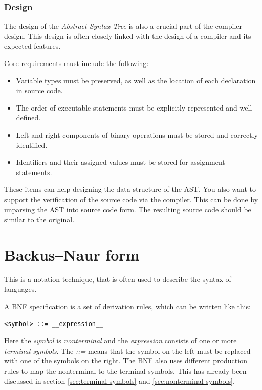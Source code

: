 \subsubsection{Design}

The design of the \textit{Abstract Syntax Tree} is also a crucial part of the compiler design. This design is often closely linked with the design of a compiler and its expected features. 

Core requirements must include the following: 

\begin{itemize}
    \item Variable types must be preserved, as well as the location of each declaration in source code. 
    \item The order of executable statements must be explicitly represented and well defined.
    \item Left and right components of binary operations must be stored and correctly identified.
    \item Identifiers and their assigned values must be stored for assignment statements.
\end{itemize}

These items can help designing the data structure of the AST. You also want to support the verification of the source code via the compiler. This can be done by unparsing the AST into source code form. The resulting source code should be similar to the original. 





\section{Backus–Naur form}
\label{sec:backus-naur-form}

This is a notation technique, that is often used to describe the syntax of languages. 

A BNF specification is a set of derivation rules, which can be written like this: 

\begin{verbatim}
<symbol> ::= __expression__
\end{verbatim}

Here the \textit{symbol} is \textit{nonterminal} and the \textit{expression} consists of one or more \textit{terminal symbols}. The \textit{::=} means that the symbol on the left must be replaced with one of the symbols on the right. The BNF also uses different production rules to map the nonterminal to the terminal symbols. This has already been discussed in section \ref{sec:terminal-symbols} and \ref{sec:nonterminal-symbols}.

